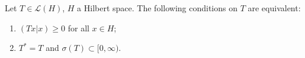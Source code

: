 Let $T \in \mathcal{L}(H)$, $H$ a Hilbert space. The following conditions on $T$ are equivalent:
\begin{enumerate}
\item[(a)] $(Tx|x) \geq 0$ for all $x \in H$;
\item[(b)] $T^* = T$ and $\sigma(T) \subset [0, \infty)$.
\end{enumerate}
